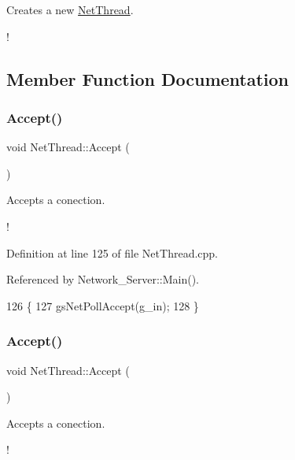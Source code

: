 Creates a new \hyperlink{class_net_thread}{Net\+Thread}. 

! 

\subsection{Member Function Documentation}
\mbox{\label{class_net_thread_ae43eb627a7b606c819ef19f148eb250f}} 
\subsubsection{\texorpdfstring{Accept()}{Accept()}\hspace{0.1cm}{\footnotesize\ttfamily [1/2]}}
{\footnotesize\ttfamily void Net\+Thread\+::\+Accept (\begin{DoxyParamCaption}{ }\end{DoxyParamCaption})}



Accepts a conection. 

! 

Definition at line 125 of file Net\+Thread.\+cpp.



Referenced by Network\+\_\+\+Server\+::\+Main().


\begin{DoxyCode}
126 \{
127     gsNetPollAccept(g\_in);
128 \}
\end{DoxyCode}
\mbox{\label{class_net_thread_ae43eb627a7b606c819ef19f148eb250f}} 
\subsubsection{\texorpdfstring{Accept()}{Accept()}\hspace{0.1cm}{\footnotesize\ttfamily [2/2]}}
{\footnotesize\ttfamily void Net\+Thread\+::\+Accept (\begin{DoxyParamCaption}{ }\end{DoxyParamCaption})}



Accepts a conection. 

! \mbox{\label{class_net_thread_ad21658535369817214ae60a6b5fe01e9}} 
